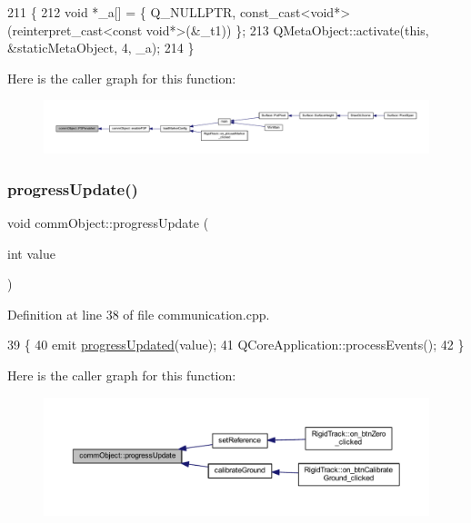 \begin{DoxyCode}
211 \{
212     \textcolor{keywordtype}{void} *\_a[] = \{ Q\_NULLPTR, \textcolor{keyword}{const\_cast<}\textcolor{keywordtype}{void}*\textcolor{keyword}{>}(\textcolor{keyword}{reinterpret\_cast<}\textcolor{keyword}{const }\textcolor{keywordtype}{void}*\textcolor{keyword}{>}(&\_t1)) \};
213     QMetaObject::activate(\textcolor{keyword}{this}, &staticMetaObject, 4, \_a);
214 \}
\end{DoxyCode}
Here is the caller graph for this function\+:\nopagebreak
\begin{figure}[H]
\begin{center}
\leavevmode
\includegraphics[width=350pt]{classcomm_object_af369de87a7f2c9b7170223bedd6c08d9_icgraph}
\end{center}
\end{figure}
\mbox{\label{classcomm_object_acfc97f4310e2b7d841ecb8cf8be0088e}} 
\subsubsection{\texorpdfstring{progress\+Update()}{progressUpdate()}}
{\footnotesize\ttfamily void comm\+Object\+::progress\+Update (\begin{DoxyParamCaption}\item[{int}]{value }\end{DoxyParamCaption})}



Definition at line 38 of file communication.\+cpp.


\begin{DoxyCode}
39 \{
40     emit \hyperlink{classcomm_object_a6039d306f25a6b46c78942edf9cee662}{progressUpdated}(value);
41     QCoreApplication::processEvents();
42 \}
\end{DoxyCode}
Here is the caller graph for this function\+:\nopagebreak
\begin{figure}[H]
\begin{center}
\leavevmode
\includegraphics[width=350pt]{classcomm_object_acfc97f4310e2b7d841ecb8cf8be0088e_icgraph}
\end{center}
\end{figure}
\mbox{\label{classcomm_object_a6039d306f25a6b46c78942edf9cee662}} 
